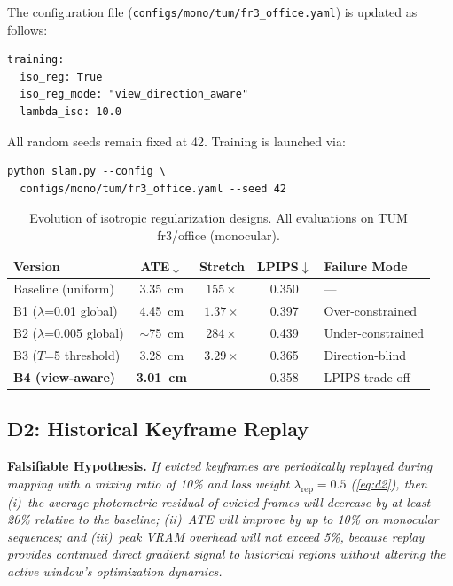 \documentclass[conference]{IEEEtran}
\begin{document}
The configuration file (\texttt{configs/mono/tum/\allowbreak fr3\_office.yaml}) is updated as follows:
{\small\begin{verbatim}
training:
  iso_reg: True
  iso_reg_mode: "view_direction_aware"
  lambda_iso: 10.0
\end{verbatim}}
All random seeds remain fixed at 42.
Training is launched via:
{\scriptsize\begin{verbatim}python slam.py --config \
  configs/mono/tum/fr3_office.yaml --seed 42
\end{verbatim}}

\begin{table}[htbp]
\caption{Evolution of isotropic regularization designs. All evaluations on TUM fr3/office (monocular).}
\label{tab:b_evolution}
\begin{center}
\footnotesize
\setlength{\tabcolsep}{3pt}
\begin{tabular}{|>{\centering\arraybackslash}m{60pt}|c|c|c|>{\centering\arraybackslash}m{52pt}|}
\hline
\textbf{Version} & \textbf{ATE$\downarrow$} & \textbf{Stretch} & \textbf{LPIPS$\downarrow$} & \textbf{Failure Mode} \\
\hline
Baseline (uniform) & 3.35~cm & $155\times$ & 0.350 & --- \\
B1 ($\lambda$=0.01 global) & 4.45~cm & $1.37\times$ & 0.397 & Over-constrained \\
B2 ($\lambda$=0.005 global) & $\sim$75~cm & $284\times$ & 0.439 & Under-constrained \\
B3 ($T$=5 threshold) & 3.28~cm & $3.29\times$ & 0.365 & Direction-blind \\
\textbf{B4 (view-aware)} & \textbf{3.01~cm} & --- & 0.358 & LPIPS trade-off \\
\hline
\end{tabular}
\end{center}
\end{table}

\subsection{{D2}: Historical Keyframe Replay}
\label{sec:d2}

\textbf{Falsifiable Hypothesis.}
\textit{If evicted keyframes are periodically replayed during mapping with a mixing ratio of 10\% and loss weight $\lambda_{\text{rep}}=0.5$ (\eqref{eq:d2}), then (i)~the average photometric residual of evicted frames will decrease by at least 20\% relative to the baseline; (ii)~ATE will improve by up to 10\% on monocular sequences; and (iii)~peak VRAM overhead will not exceed 5\%, because replay provides continued direct gradient signal to historical regions without altering the active window's optimization dynamics.}
\end{document}
